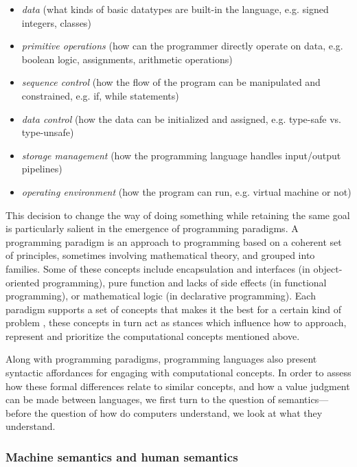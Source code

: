 \begin{itemize}
  \item{\emph{data} (what kinds of basic datatypes are built-in the language, e.g. signed integers, classes)}
  \item{\emph{primitive operations} (how can the programmer directly operate on data, e.g. boolean logic, assignments, arithmetic operations)}
  \item{\emph{sequence control} (how the flow of the program can be manipulated and constrained, e.g. if, while statements)}
  \item{\emph{data control} (how the data can be initialized and assigned, e.g. type-safe vs. type-unsafe)}
  \item{\emph{storage management} (how the programming language handles input/output pipelines)}
  \item{\emph{operating environment} (how the program can run, e.g. virtual machine or not)}
\end{itemize}

This decision to change the way of doing something while retaining the same goal is particularly salient in the emergence of programming paradigms. A programming paradigm is an approach to programming based on a coherent set of principles, sometimes involving mathematical theory, and grouped into families. Some of these concepts include encapsulation and interfaces (in object-oriented programming), pure function and lacks of side effects (in functional programming), or mathematical logic (in declarative programming). Each paradigm supports a set of concepts that makes it the best for a certain kind of problem \citep{vanroy_programming_2012}, these concepts in turn act as stances which influence how to approach, represent and prioritize the computational concepts mentioned above.

Along with programming paradigms, programming languages also present syntactic affordances for engaging with computational concepts. In order to assess how these formal differences relate to similar concepts, and how a value judgment can be made between languages, we first turn to the question of semantics—before the question of how do computers understand, we look at what they understand.

\subsubsection{Machine semantics and human semantics}
\label{subsubsec:machine-semantics-human-semantics}

